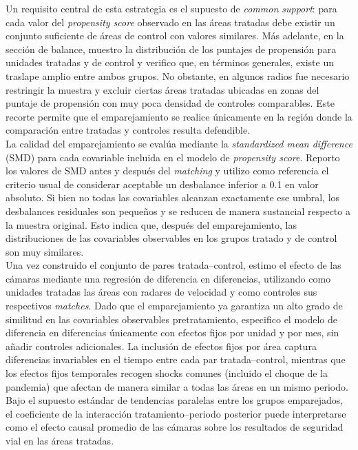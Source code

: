 Un requisito central de esta estrategia es el supuesto de \emph{common support}: para cada valor del \emph{propensity score} observado en las áreas tratadas debe existir un conjunto suficiente de áreas de control con valores similares. Más adelante, en la sección de balance, muestro la distribución de los puntajes de propensión para unidades tratadas y de control y verifico que, en términos generales, existe un traslape amplio entre ambos grupos. No obstante, en algunos radios fue necesario restringir la muestra y excluir ciertas áreas tratadas ubicadas en zonas del puntaje de propensión con muy poca densidad de controles comparables. Este recorte permite que el emparejamiento se realice únicamente en la región donde la comparación entre tratadas y controles resulta defendible.\\

La calidad del emparejamiento se evalúa mediante la \emph{standardized mean difference} (SMD) para cada covariable incluida en el modelo de \emph{propensity score}. Reporto los valores de SMD antes y después del \emph{matching} y utilizo como referencia el criterio usual de considerar aceptable un desbalance inferior a 0.1 en valor absoluto. Si bien no todas las covariables alcanzan exactamente ese umbral, los desbalances residuales son pequeños y se reducen de manera sustancial respecto a la muestra original. Esto indica que, después del emparejamiento, las distribuciones de las covariables observables en los grupos tratado y de control son muy similares.\\

Una vez construido el conjunto de pares tratada–control, estimo el efecto de las cámaras mediante una regresión de diferencia en diferencias, utilizando como unidades tratadas las áreas con radares de velocidad y como controles sus respectivos \emph{matches}. Dado que el emparejamiento ya garantiza un alto grado de similitud en las covariables observables pretratamiento, especifico el modelo de diferencia en diferencias únicamente con efectos fijos por unidad y por mes, sin añadir controles adicionales. La inclusión de efectos fijos por área captura diferencias invariables en el tiempo entre cada par tratada–control, mientras que los efectos fijos temporales recogen shocks comunes (incluido el choque de la pandemia) que afectan de manera similar a todas las áreas en un mismo periodo. Bajo el supuesto estándar de tendencias paralelas entre los grupos emparejados, el coeficiente de la interacción tratamiento–periodo posterior puede interpretarse como el efecto causal promedio de las cámaras sobre los resultados de seguridad vial en las áreas tratadas.\\

